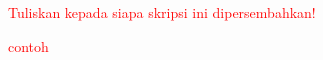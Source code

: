 \vspace{7cm}

\begin{center}
	\textcolor{red}
	{Tuliskan kepada siapa skripsi ini dipersembahkan!}
	
	\textcolor{red}{contoh}
		
\end{center}

